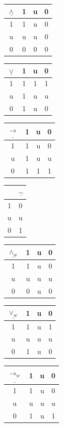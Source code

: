 \documentclass[10pt,a4paper]{article}
\theoremstyle{definition}
\newcommand{\3}{\vspace{.3in}}
\newcommand{\2}{\vspace{.2in}}
\newcommand{\1}{\vspace{.1in}}
\newcommand{\5}{\vspace{.05in}}
\begin{document}
\begin{center}
	\begin{tabular}{|c|ccc|}
		\hline
		$\underline{\wedge} $ & 1 & u & 0 \\
		\hline
		1 & 1 & u & 0 \\
		u & u & u & 0 \\
		0 & 0 & 0 & 0 \\
		\hline
	\end{tabular}
	\begin{tabular}{|c|ccc|}
		\hline$\underline{\vee} $ & 1 & u & 0 \\\hline
		1 & 1 & 1 & 1 \\
		u & 1 & u & u \\
		0 & 1 & u & 0 \\\hline
	\end{tabular}
	\begin{tabular}{|c|ccc|}
		\hline
		$\underline{\rightarrow} $ & 1 & u & 0 \\
		\hline
		1 & 1 & u & 0 \\
		u & 1 & u & u \\
		0 & 1 & 1 & 1 \\
		\hline
	\end{tabular}
	\begin{tabular}{|c|c|}
		\hline  & $\underline{\neg} $\\\hline
		1 & 0\\
		u & u \\
		0 & 1 \\\hline
	\end{tabular}
\end{center} 
\begin{center} 	
\begin{tabular}{|c|ccc|}
	\hline
	$\underline{\wedge_w} $ & 1 & u & 0 \\
	\hline
	1 & 1 & u & 0 \\
	u & u & u & u \\
	0 & 0 & u & 0 \\
	\hline
\end{tabular}
\begin{tabular}{|c|ccc|}
	\hline$\underline{\vee_w} $ & 1 & u & 0 \\\hline
	1 & 1 & u & 1 \\
	u & u & u & u \\
	0 & 1 & u & 0 \\\hline
\end{tabular}
\begin{tabular}{|c|ccc|}
	\hline
	$\underline{\rightarrow_w} $ & 1 & u & 0 \\
	\hline
	1 & 1 & u & 0 \\
	u & u & u & u \\
	0 & 1 & u & 1 \\
	\hline
\end{tabular}
\end{center} 
\end{document}

